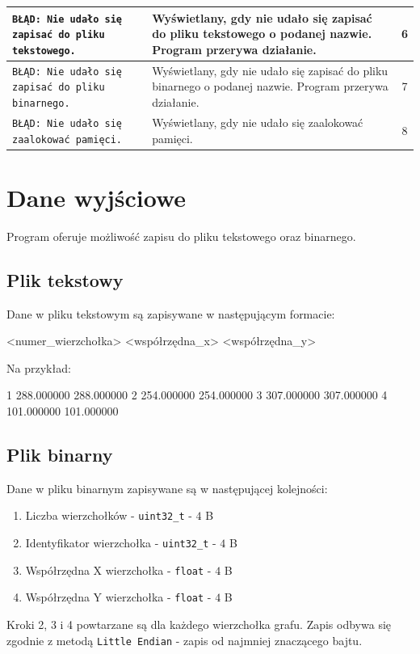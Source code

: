 \documentclass[]{article}
\begin{document}
\begin{tabularx}{\textwidth}{| X | X | c |}
		\hline
		\texttt{BŁĄD: Nie udało się zapisać do pliku tekstowego.} & Wyświetlany, gdy nie udało się zapisać do pliku tekstowego o 
		podanej nazwie. Program przerywa działanie. & 6\\
		\hline
		\texttt{BŁĄD: Nie udało się zapisać do pliku binarnego.} & Wyświetlany, gdy nie udało się zapisać do pliku binarnego o
		podanej nazwie. Program przerywa działanie. & 7\\
		\hline
		\texttt{BŁĄD: Nie udało się zaalokować pamięci.} & Wyświetlany, gdy nie udało się zaalokować pamięci. & 8\\
		\hline
	\end{tabularx}

	\section{Dane wyjściowe}
	Program oferuje możliwość zapisu do pliku tekstowego oraz binarnego. 
	
	\subsection{Plik tekstowy}
	Dane w pliku tekstowym są zapisywane w następującym formacie:
	\begin{mylisting}
<numer_wierzchołka> <współrzędna_x> <współrzędna_y>
	\end{mylisting}
	Na przykład:
	\begin{mylisting}
1 288.000000 288.000000
2 254.000000 254.000000
3 307.000000 307.000000
4 101.000000 101.000000
	\end{mylisting}
	\subsection{Plik binarny}
	Dane w pliku binarnym zapisywane są w następującej kolejności:
	\begin{enumerate}
		\item Liczba wierzchołków - \texttt{uint32\_t} - $4$ B
		\item Identyfikator wierzchołka - \texttt{uint32\_t} - $4$ B
		\item Współrzędna X wierzchołka - \texttt{float} - $4$ B 
		\item Współrzędna Y wierzchołka - \texttt{float} - $4$ B
	\end{enumerate}
	Kroki 2, 3 i 4 powtarzane są dla każdego wierzchołka grafu. Zapis odbywa się zgodnie z metodą \texttt{Little Endian}
	- zapis od najmniej znaczącego bajtu.
\end{document}
